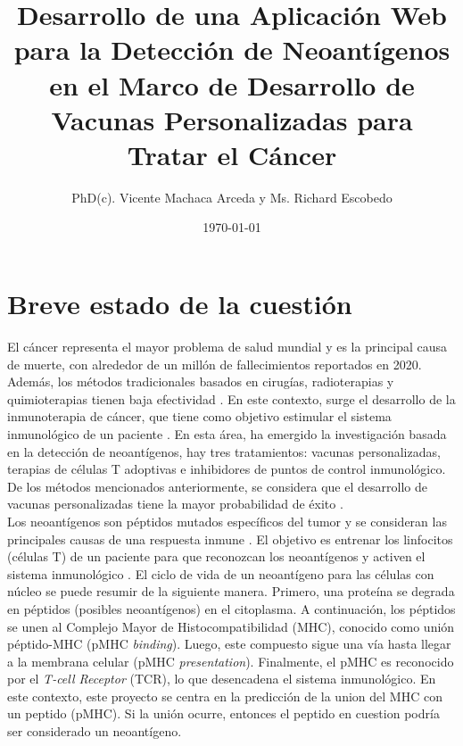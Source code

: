 \documentclass[a4paper]{article}
\title{Desarrollo de una Aplicación Web para la Detección de Neoantígenos en el Marco de Desarrollo de Vacunas Personalizadas para Tratar el Cáncer }
\author{PhD(c). Vicente Machaca Arceda y Ms. Richard Escobedo}
\date{\today}
\begin{document}
	

	
	
	
	
	
	
	
	\maketitle
	
	\section{Breve estado de la cuestión}
	
	El cáncer representa el mayor problema de salud mundial y es la principal causa de muerte, con alrededor de un millón de fallecimientos reportados en 2020. Además, los métodos tradicionales basados en cirugías, radioterapias y quimioterapias tienen baja efectividad \citep{peng2019neoantigen}. En este contexto, surge el desarrollo de la inmunoterapia de cáncer, que tiene como objetivo estimular el sistema inmunológico de un paciente \citep{borden2022cancer}. En esta área, ha emergido la investigación basada en la detección de neoantígenos, hay tres tratamientos: vacunas personalizadas, terapias de células T adoptivas e inhibidores de puntos de control inmunológico. De los métodos mencionados anteriormente, se considera que el desarrollo de vacunas personalizadas  tiene la mayor probabilidad de éxito \citep{borden2022cancer}.\\

Los neoantígenos son péptidos mutados específicos del tumor y se consideran las principales causas de una respuesta inmune \citep{borden2022cancer,chen2021challenges,gopanenko2020main}. El objetivo es entrenar los linfocitos (células T) de un paciente para que reconozcan los neoantígenos y activen el sistema inmunológico \citep{de2020neoantigen,peng2019neoantigen}. El ciclo de vida de un neoantígeno para las células con núcleo se puede resumir de la siguiente manera. Primero, una proteína se degrada en péptidos (posibles neoantígenos) en el citoplasma. A continuación, los péptidos se unen al Complejo Mayor de Histocompatibilidad (MHC), conocido como unión péptido-MHC (pMHC \textit{binding}). Luego, este compuesto sigue una vía hasta llegar a la membrana celular (pMHC \textit{presentation}). Finalmente, el pMHC es reconocido por el \textit{T-cell Receptor} (TCR), lo que desencadena el sistema inmunológico. En este contexto, este proyecto se centra en la predicción de la union del MHC con un peptido (pMHC). Si la unión ocurre, entonces el peptido en cuestion podría ser considerado un neoantígeno. \\
\end{document}

